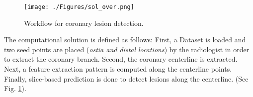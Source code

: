 \begin{figure}[htbp]
	\centering
		\texttt{[image: ./Figures/sol\_over.png]}
	\caption[Solution Workflow.]{Workflow for coronary lesion detection.}
	\label{fig:Workflow}
\end{figure}

The computational solution is defined as follows: First, a Dataset is loaded and two seed points are placed (\textit{ostia and distal locations}) by the radiologist in order to extract the coronary branch. Second, the coronary centerline is extracted. Next, a feature extraction pattern is computed along the centerline points. Finally, slice-based prediction is done to detect lesions along the centerline. (See Fig. \ref{fig:Workflow}).